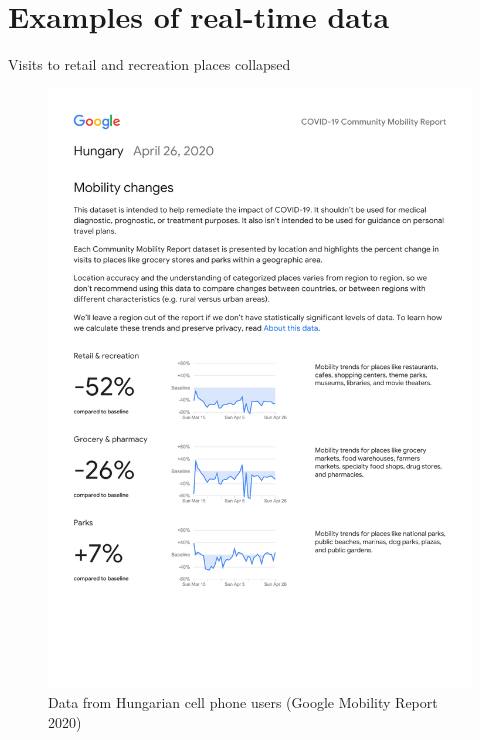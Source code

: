 \documentclass[
  ignorenonframetext,
  aspectratio=54,
]{beamer}
\begin{document}
\hypertarget{examples-of-real-time-data}{%
\section{Examples of real-time data}\label{examples-of-real-time-data}}

\begin{frame}{Visits to retail and recreation places collapsed}
\protect\hypertarget{visits-to-retail-and-recreation-places-collapsed}{}
\begin{figure}
\centering
\includegraphics[width=1\textwidth,height=\textheight]{exhibit/fig/gmr-retail.pdf}
\caption{Data from Hungarian cell phone users (Google Mobility Report
2020)}
\end{figure}
\end{frame}
\end{document}
